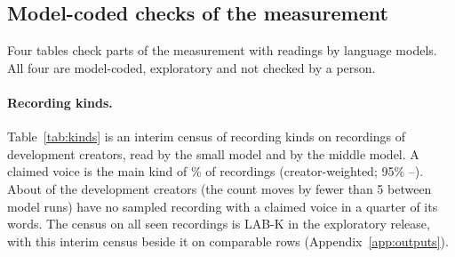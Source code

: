 \begin{table}[tp]
\centering
\small

\caption{Per headline: the creator-equal baseline, the margin fixed before the run, the range over the \RFourSpecs{}
specifications, how many specifications move the estimate beyond the margin, how many place its interval outside it,
and the specification that moves it most. Baselines are the sensitivity build's own creator-equal estimates and can
differ in the last digit from the figures of Section~\ref{sec:measure}. The cue-count rows are robustness rows of the
reporting plan, not headlines of this paper and not findings about channelling.}
\label{tab:sensitivity}
\end{table}

\begin{table}[tp]
\centering
\small

\caption{Drift, part 1: each number computed at the snapshot that defined the hold-out (\SnapLines{} finished
transcripts) against the closed run, like with like. ``--'' marks a snapshot without this estimand or with another
definition, and snapshot values computed from the transcripts or timing of all creators, hold-out included, which are not
printed; the comparison column says which. A difference also mixes more transcripts. ICCs here are point values; their
intervals for the closed run are in Tables~\ref{tab:headlines-b} and~\ref{tab:vp}.}
\label{tab:drift}
\end{table}

\begin{table}[tp]
\centering
\small

\caption{Drift, part 2 (columns as in part 1).}
\label{tab:drift-b}
\end{table}

\subsection{Model-coded checks of the measurement}
\label{app:modelcoded}

Four tables check parts of the measurement with readings by language models. All four are model-coded, exploratory and
not checked by a person.

\paragraph{Recording kinds.} Table~\ref{tab:kinds} is an interim census of recording kinds on \LOneRecordings{}
recordings of \LOneCreators{} development creators, read by the small model and by the middle model. A claimed voice is
the main kind of \LOneClaimedMainPct\% of recordings (creator-weighted; 95\% \LOneClaimedMainLo--\LOneClaimedMainHi).
About \LOneNoClaimedCreators{} of the \LOneCreators{} development creators (the count moves by fewer than 5 between
model runs) have no sampled recording with a claimed voice in a quarter of its words. The census on all seen recordings
is LAB-K in the exploratory release, with this interim census beside it on comparable rows (Appendix~\ref{app:outputs}).


